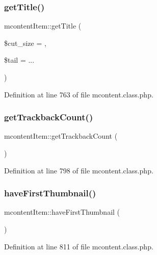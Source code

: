 \subsubsection{\texorpdfstring{get\+Title()}{getTitle()}}
{\footnotesize\ttfamily mcontent\+Item\+::get\+Title (\begin{DoxyParamCaption}\item[{}]{\$cut\+\_\+size = {},  }\item[{}]{\$tail = {\ttfamily \textquotesingle{}...\textquotesingle{}} }\end{DoxyParamCaption})}



Definition at line 763 of file mcontent.\+class.\+php.

\hypertarget{classmcontentItem_afb955c421fa34f36c51edd795d3a00c7}{}\label{classmcontentItem_afb955c421fa34f36c51edd795d3a00c7} 
\subsubsection{\texorpdfstring{get\+Trackback\+Count()}{getTrackbackCount()}}
{\footnotesize\ttfamily mcontent\+Item\+::get\+Trackback\+Count (\begin{DoxyParamCaption}{ }\end{DoxyParamCaption})}



Definition at line 798 of file mcontent.\+class.\+php.

\hypertarget{classmcontentItem_ac8b5fb3d84cdc8a96a8c02e9472e25dd}{}\label{classmcontentItem_ac8b5fb3d84cdc8a96a8c02e9472e25dd} 
\subsubsection{\texorpdfstring{have\+First\+Thumbnail()}{haveFirstThumbnail()}}
{\footnotesize\ttfamily mcontent\+Item\+::have\+First\+Thumbnail (\begin{DoxyParamCaption}{ }\end{DoxyParamCaption})}



Definition at line 811 of file mcontent.\+class.\+php.


